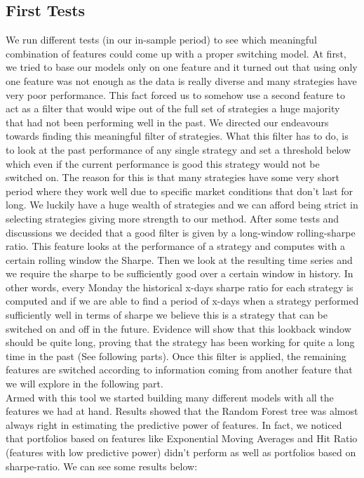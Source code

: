 \documentclass[12pt]{article} %
\numberwithin{equation}{subsection}
\begin{document}
\subsection{First Tests}

We run different tests (in our in-sample period) to see which meaningful combination of features could come up with a proper switching model. At first, we tried to base our models only on one feature and it turned out that using only one feature was not enough as the data is really diverse and many strategies have very poor performance. This fact forced us to somehow use a second feature to act as a filter that would wipe out of the full set of strategies a huge majority that had not been performing well in the past. We directed our endeavours towards finding this meaningful filter of strategies. What this filter has to do, is to look at the past performance of any single strategy and set a threshold below which even if the current performance is good this strategy would not be switched on. The reason for this is that many strategies have some very short period where they work well due to specific market conditions that don't last for long. We luckily have a huge wealth of strategies and we can afford being strict in selecting strategies giving more strength to our method. After some tests and discussions we decided that a good filter is given by a long-window rolling-sharpe ratio. This feature looks at the performance of a strategy and computes with a certain rolling window the Sharpe. Then we look at the resulting time series and we require the sharpe to be sufficiently good over a certain window in history. In other words, every Monday the historical x-days sharpe ratio for each strategy is computed and if we are able to find  a period of x-days when a strategy performed sufficiently well in terms of sharpe we believe this is a strategy that can be switched on and off in the future. Evidence will show that this lookback window should be quite long, proving that the strategy has been working for quite a long time in the past (See following parts). Once this filter is applied, the remaining features are switched according to information coming from another feature that we will explore in the following part.\\
Armed with this tool we started building many different models with all the features we had at hand. Results showed that the Random Forest tree was almost always right in estimating the predictive power of features. In fact, we noticed that portfolios based on features like Exponential Moving Averages and Hit Ratio (features with low predictive power) didn't perform as well as portfolios based on sharpe-ratio. We can see some results below:
\end{document}
